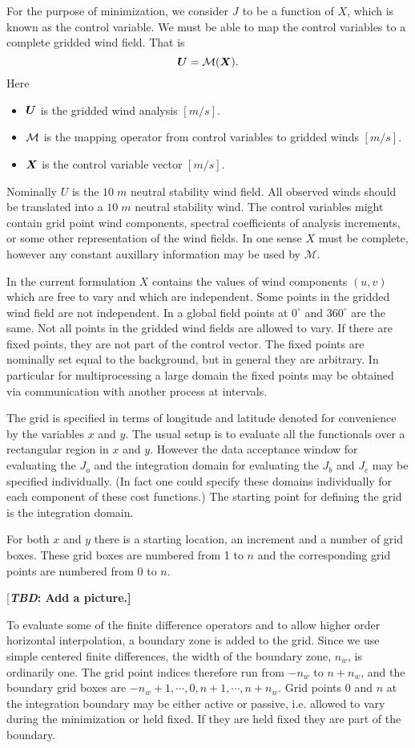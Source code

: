 \documentclass[11pt]{article}
\newcommand{\degrees}[1]{\mbox{$ {#1}^\circ $}}
\newcommand{\J}[1]{\mbox{$ J_{#1} $}}
\newcommand{\mks}[2]{\mbox{$ {#1} \; {#2} $}}
\newcommand{\Vector}[1]{\mbox{\boldmath ${#1}$}}
\newcommand{\TBD}[1]{{[\bfseries{\itshape{TBD: }{{#1}}}]}}
\newcommand{\eql}[2]{\begin{equation} \label{eq:#1} #2 \end{equation}}
\newcommand{\COMMENT}[2]{{[\bfseries {\itshape #1}: {#2}]}}
\renewcommand{\TBD}[1]{\COMMENT{TBD}{{#1}}}
\newcommand{\vardef}[3]{\item $ {#1} $ is the {#2} $ [{#3}] $. }
\newcommand{\Operator}[1]{\mbox{$ \mathcal #1 $}}
\begin{document}
For the purpose of minimization, we consider \J{} to be a function of
\Vector{X}, which is known as the control variable.  We must be able
to map the control variables to a complete gridded wind field.  That is
 \eql{map}{\Vector{U} = \Operator{M}(\Vector{X}) . } 
 Here \begin{itemize}
  \vardef{\Vector{U}}{gridded wind analysis}{m/s}
  \vardef{\Operator{M}}{mapping operator from control variables to gridded winds}{m/s}
  \vardef{\Vector{X}}{control variable vector}{m/s}
 \end{itemize} 
  Nominally \Vector{U} is the \mks{10}{m} neutral stability wind
field.  All observed winds should be translated into a \mks{10}{m}
neutral stability wind.  The control variables might contain grid
point wind components, spectral coefficients of analysis increments,
or some other representation of the wind fields.  In one sense
\Vector{X} must be complete, however any constant auxillary
information may be used by \Operator{M}.

In the current formulation \Vector{X} contains the values of wind
components $(u,v)$ which are free to vary and which are independent.
Some points in the gridded wind field are not independent.
In a global field points at \degrees{0} and \degrees{360} are the same.
Not all points in the gridded wind fields are allowed to vary.  If
there are fixed points, they are not part of the control
vector.  The fixed points are nominally set equal to the background,
but in general they are arbitrary.  In particular for multiprocessing
a large domain the fixed points may be obtained via communication with
another process at intervals.

The grid is specified in terms of longitude and latitude denoted for
convenience by the variables $x$ and $y$.  The usual setup is to
evaluate all the functionals over a rectangular region in $x$ and $y$.
However the data acceptance window for evaluating the \J{o} and the
integration domain for evaluating the \J{b} and \J{c} may be specified
individually.  (In fact one could specify these domains individually
for each component of these cost functions.)  The starting point for
defining the grid is the integration domain.

For both $x$ and $y$ there is a starting location, an increment and a
number of grid boxes.  These grid boxes are numbered from 1 to $n$ and
the corresponding grid points are numbered from 0 to $n$.

 \TBD{Add a picture.}

To evaluate some of the finite difference operators and to allow
higher order horizontal interpolation, a boundary zone is added to the
grid.  Since we use simple centered finite differences, the width of
the boundary zone, $n_w$, is ordinarily one.  The grid point indices
therefore run from $-n_w$ to $n+n_w$, and the boundary grid boxes are
$ -n_w+1, \cdots, 0, n+1, \cdots, n+n_w $.  Grid points 0 and $n$ at
the integration boundary may be either active or passive, i.e. allowed
to vary during the minimization or held fixed.  If they are held fixed
they are part of the boundary.
\end{document}
